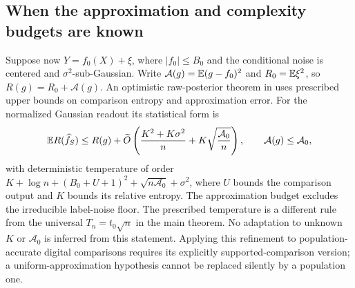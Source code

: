 \subsection{When the approximation and complexity budgets are known}
Suppose now $Y=f_0(X)+\xi$, where $|f_0|\le B_0$ and the conditional
noise is centered and $\sigma^2$-sub-Gaussian.  Write
$\mathcal A(g)=\mathbb E(g-f_0)^2$ and $R_0=\mathbb E\xi^2$, so
$R(g)=R_0+\mathcal A(g)$.  An optimistic raw-posterior theorem in
\cite{rawprior} uses prescribed upper bounds on comparison entropy and
approximation error.  For the normalized Gaussian readout its
statistical form is
\[
 \mathbb E R(\widehat f_S)\le R(g)
 +\widetilde O\left(\frac{K^2+K\sigma^2}{n}
                         +K\sqrt{\frac{\mathcal A_0}{n}}\right),
 \qquad \mathcal A(g)\le\mathcal A_0,
\]
with deterministic temperature of order
$K+\log n+(B_0+U+1)^2+\sqrt{n\mathcal A_0}+\sigma^2$,
where $U$ bounds the comparison output and $K$ bounds its relative entropy.
The approximation budget excludes the irreducible label-noise floor.
The prescribed temperature is a different rule from the universal
$T_n=t_0\sqrt n$ in the main theorem.  No adaptation to unknown $K$ or
$\mathcal A_0$ is inferred from this statement.  Applying this refinement
to population-accurate digital comparisons requires its explicitly
supported-comparison version; a uniform-approximation hypothesis cannot
be replaced silently by a population one.
